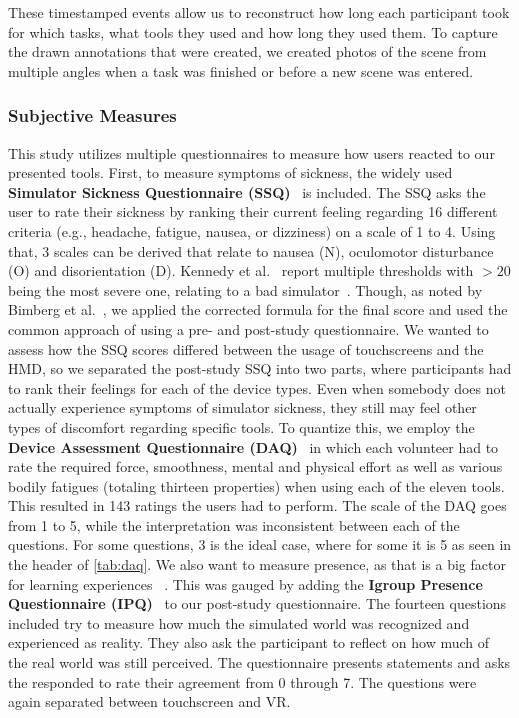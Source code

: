 These timestamped events allow us to reconstruct how long each participant took for which tasks, what tools they used and how long they used them. To capture the drawn annotations that were created, we created photos of the scene from multiple angles when a task was finished or before a new scene was entered.




\subsubsection{Subjective Measures}
This study utilizes multiple questionnaires to measure how users reacted to our presented tools. First, to measure symptoms of sickness, the widely used \textbf{Simulator Sickness Questionnaire (SSQ)}~\cite{ssqOriginal} is included. The SSQ asks the user to rate their sickness by ranking their current feeling regarding 16 different criteria (e.g., headache, fatigue, nausea, or dizziness) on a scale of 1 to 4. Using that, 3 scales can be derived that relate to nausea (N), oculomotor disturbance (O) and disorientation (D). Kennedy et al.~\cite{ssqOriginal} report multiple thresholds with $>20$ being the most severe one, relating to a bad simulator~\cite{ssqFix}. Though, as noted by Bimberg et al.~\cite{ssqFix}, we applied the corrected formula for the final score and used the common approach of using a pre- and post-study questionnaire. We wanted to assess how the SSQ scores differed between the usage of touchscreens and the HMD, so we separated the post-study SSQ into two parts, where participants had to rank their feelings for each of the device types.
%
Even when somebody does not actually experience symptoms of simulator sickness, they still may feel other types of discomfort regarding specific tools. To quantize this, we employ the \textbf{Device Assessment Questionnaire (DAQ)}~\cite{daq} in which each volunteer had to rate the required force, smoothness, mental and physical effort as well as various bodily fatigues (totaling thirteen properties) when using each of the eleven tools. This resulted in 143 ratings the users had to perform. The scale of the DAQ goes from 1 to 5, while the interpretation was inconsistent between each of the questions. For some questions, 3 is the ideal case, where for some it is 5 as seen in the header of \autoref{tab:daq}.
%
We also want to measure presence, as that is a big factor for learning experiences ~\cite{presenceLearning}. This was gauged by adding the \textbf{Igroup Presence Questionnaire (IPQ)}~\cite{ipq} to our post-study questionnaire. The fourteen questions included try to measure how much the simulated world was recognized and experienced as reality. They also ask the participant to reflect on how much of the real world was still perceived. The questionnaire presents statements and asks the responded to rate their agreement from 0 through 7. The questions were again separated between touchscreen and VR. 



